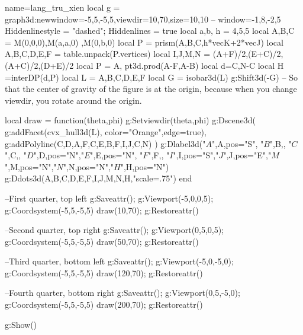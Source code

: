 \documentclass[border=2 mm]{standalone}
\begin{document}
\begin{luadraw}{name=lang_tru_xien}
local g = graph3d:new{window={-5,5,-5,5},viewdir={10,70},size={10,10}} -- window={-1,8,-2,5}
Hiddenlinestyle = "dashed"; Hiddenlines = true
local a,b, h = 4,5,5
local A,B,C = M(0,0,0),M(a,a,0) ,M(0,b,0)
local P = prism({A,B,C},h*vecK+2*vecJ)
local A,B,C,D,E,F = table.unpack(P.vertices)
local I,J,M,N = (A+F)/2,(E+C)/2,(A+C)/2,(D+E)/2
local P = {A, pt3d.prod(A-F,A-B)}
local d={C,N-C}
local H =interDP(d,P) 
local L = {A,B,C,D,E,F}
local G = isobar3d(L)
g:Shift3d(-G) -- So that the center of gravity of the figure is at the origin, because when you change viewdir, you rotate around the origin.

local draw = function(theta,phi)
    g:Setviewdir(theta,phi)
    g:Dscene3d(
        g:addFacet(cvx_hull3d(L), {color="Orange",edge=true}),
        g:addPolyline({{C,D},{A,F},{C,E},{B,F},{I,J},{C,N}})
        )
    g:Dlabel3d("$A$",A,{pos="S"}, "$B$",B,{}, "$C$",C,{}, "$D$",D,{pos="N"},"$E$",E,{pos="N"}, "$F$",F,{}, "$I$",I,{pos="S"},"$J$",J,{pos="E"},"$M$",M,{pos="N"},"$N$",N,{pos="N"},"$H$",H,{pos="N"})
    g:Ddots3d({A,B,C,D,E,F,I,J,M,N,H},"scale=.75")
end

--First quarter, top left
g:Saveattr(); g:Viewport(-5,0,0,5); g:Coordsystem(-5,5,-5,5)
draw(10,70); g:Restoreattr()

--Second quarter, top right
g:Saveattr(); g:Viewport(0,5,0,5); g:Coordsystem(-5,5,-5,5)
draw(50,70); g:Restoreattr()

--Third quarter, bottom left
g:Saveattr(); g:Viewport(-5,0,-5,0); g:Coordsystem(-5,5,-5,5)
draw(120,70); g:Restoreattr()

--Fourth quarter, bottom right
g:Saveattr(); g:Viewport(0,5,-5,0); g:Coordsystem(-5,5,-5,5)
draw(200,70); g:Restoreattr()

g:Show()
\end{luadraw}
\end{document}
